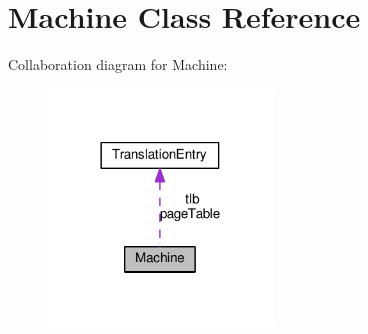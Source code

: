 \section{Machine Class Reference}
\label{class_machine}


Collaboration diagram for Machine\+:\nopagebreak
\begin{figure}[H]
\begin{center}
\leavevmode
\includegraphics[width=170pt]{class_machine__coll__graph}
\end{center}
\end{figure}

